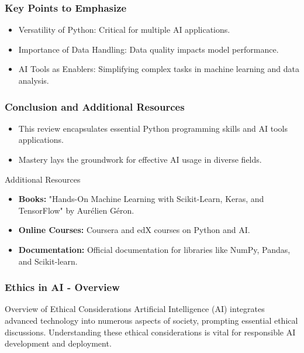 \documentclass[aspectratio=169]{beamer}
\begin{document}
\begin{frame}
    \frametitle{Key Points to Emphasize}
    \begin{itemize}
        \item Versatility of Python: Critical for multiple AI applications.
        \item Importance of Data Handling: Data quality impacts model performance.
        \item AI Tools as Enablers: Simplifying complex tasks in machine learning and data analysis.
    \end{itemize}
\end{frame}

\begin{frame}
    \frametitle{Conclusion and Additional Resources}
    \begin{itemize}
        \item This review encapsulates essential Python programming skills and AI tools applications.
        \item Mastery lays the groundwork for effective AI usage in diverse fields.
    \end{itemize}
    \begin{block}{Additional Resources}
        \begin{itemize}
            \item \textbf{Books:} "Hands-On Machine Learning with Scikit-Learn, Keras, and TensorFlow" by Aurélien Géron.
            \item \textbf{Online Courses:} Coursera and edX courses on Python and AI.
            \item \textbf{Documentation:} Official documentation for libraries like NumPy, Pandas, and Scikit-learn.
        \end{itemize}
    \end{block}
\end{frame}

\begin{frame}[fragile]
    \frametitle{Ethics in AI - Overview}
    \begin{block}{Overview of Ethical Considerations}
        Artificial Intelligence (AI) integrates advanced technology into numerous aspects of society, prompting essential ethical discussions. Understanding these ethical considerations is vital for responsible AI development and deployment.
    \end{block}
\end{frame}
\end{document}
